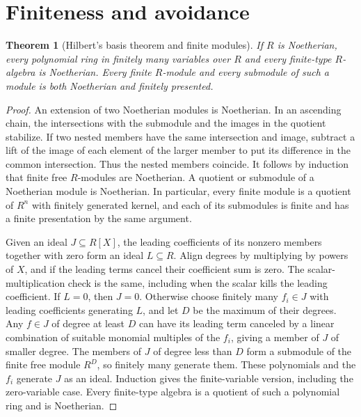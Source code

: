 \documentclass[11pt,oneside,openany]{book}
\newtheorem{theorem}{Theorem}[chapter]
\theoremstyle{definition}
\theoremstyle{remark}
\begin{document}
\section{Finiteness and avoidance}

\begin{theorem}[Hilbert's basis theorem and finite modules]\label{p103:ALG-05-C02-R01}
If \(R\) is Noetherian, every polynomial ring in finitely many variables over \(R\) and every finite-type \(R\)-algebra is Noetherian. Every finite \(R\)-module and every submodule of such a module is both Noetherian and finitely presented.
\end{theorem}
\begin{proof}
An extension of two Noetherian modules is Noetherian. In an ascending chain, the intersections with the submodule and the images in the quotient stabilize. If two nested members have the same intersection and image, subtract a lift of the image of each element of the larger member to put its difference in the common intersection. Thus the nested members coincide. It follows by induction that finite free \(R\)-modules are Noetherian. A quotient or submodule of a Noetherian module is Noetherian. In particular, every finite module is a quotient of \(R^n\) with finitely generated kernel, and each of its submodules is finite and has a finite presentation by the same argument.

Given an ideal \(J\subseteq R[X]\), the leading coefficients of its nonzero members together with zero form an ideal \(L\subseteq R\). Align degrees by multiplying by powers of \(X\), and if the leading terms cancel their coefficient sum is zero. The scalar-multiplication check is the same, including when the scalar kills the leading coefficient. If \(L=0\), then \(J=0\). Otherwise choose finitely many \(f_i\in J\) with leading coefficients generating \(L\), and let \(D\) be the maximum of their degrees. Any \(f\in J\) of degree at least \(D\) can have its leading term canceled by a linear combination of suitable monomial multiples of the \(f_i\), giving a member of \(J\) of smaller degree. The members of \(J\) of degree less than \(D\) form a submodule of the finite free module \(R^D\), so finitely many generate them. These polynomials and the \(f_i\) generate \(J\) as an ideal. Induction gives the finite-variable version, including the zero-variable case. Every finite-type algebra is a quotient of such a polynomial ring and is Noetherian.
\end{proof}
\end{document}
